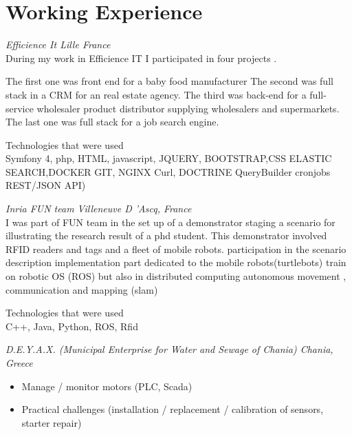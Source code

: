 \documentclass{my_cv}
\begin{document}



 \section{Working Experience}

 \textit{Efficience It Lille France}
\\
During my work in Efficience IT I participated in four projects  .  


\workitems
{The first one was front end for a baby food manufacturer}
{The second was full stack in a CRM for an
	real estate agency.}
{The third was back-end for a full-service wholesaler product distributor supplying wholesalers and supermarkets.}
{ The last one was full stack for a job search engine.}

Technologies that were used
\\
Symfony 4, php, HTML, javascript, JQUERY, BOOTSTRAP,CSS ELASTIC SEARCH,DOCKER
GIT, NGINX Curl, DOCTRINE QueryBuilder
cronjobs REST/JSON API)

\textit{Inria FUN team  Villeneuve D 'Ascq, France}
\\
I was part of FUN team in the set up of a demonstrator staging a scenario for illustrating the research result of a phd student. This demonstrator involved RFID
readers and tags and a fleet of mobile robots. 
\workitems
{participation in the scenario description}
{	implementation part dedicated to the mobile robots(turtlebots)}
{train on robotic OS (ROS)
	but also in distributed computing}
{autonomous movement , communication and mapping (slam) }

Technologies that were used
\\
C++, Java, Python, ROS, Rfid

\textit{D.E.Y.A.X. (Municipal Enterprise for Water and Sewage of Chania)  Chania,  Greece}
\\
\begin{itemize}
	\item Manage / monitor motors (PLC, Scada)
	\item Practical challenges (installation / replacement / calibration of sensors, starter repair)

\end{itemize}%
\end{document}
